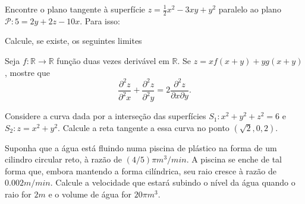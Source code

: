 \documentclass[11pt]{exam}
\begin{document}
 \begin{questions} 
     \question Encontre o plano tangente à superfície 
  $z=\frac{1}{2}x^{2}-3xy+y^{2}$ paralelo ao plano $\mathcal{P}: 5=2y+2z-10x$.
  Para isso:
    \question Calcule, se existe, os seguintes limites 
   \question 
  Seja $f:\mathbb{R}\rightarrow \mathbb{R}$ função duas vezes derivável
  em $\mathbb{R}$. Se $z=xf(x+y)+yg(x+y)$, mostre que 
  $$  \frac{\partial^{2} z }{\partial^{2}x}+
  \frac{\partial^{2} z }{\partial^{2}y}=
  2\frac{\partial^{2} z }{\partial x \partial y}. $$
    \question[20] Considere a curva dada por a interseção das 
     superfícies $S_{1}: x^{2}+y^{2}+z^{2}=6$ 
     e 
      $S_{2}: z=x^{2}+y^{2}$.
      Calcule a reta tangente a essa curva no ponto $(\sqrt{2},0,2)$. 
  
   \question[20] Suponha que a água está fluindo numa piscina de plástico na forma de um cilindro circular reto, à razão de $(4/5)\pi m^{3}/min$. A piscina se enche de tal forma que, embora mantendo a forma cilíndrica, seu raio cresce à razão de $0.002 m/min$. Calcule a velocidade que estará subindo o nível da água quando o raio for $2m$ e o volume de água for $20 \pi m^{3}$.
 \end{questions}
\end{document}
